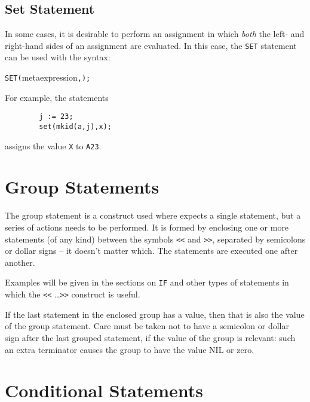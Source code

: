\subsection{Set Statement}
\hypertarget{command:SET}{}

In some cases, it is desirable to perform an assignment in which \emph{both}
the left- and right-hand sides of an assignment are
evaluated.  In this case, the \texttt{SET} statement can be used
with the syntax:
\begin{syntax}
        \texttt{SET(}meta{expression}\texttt{,}\texttt{);}
\end{syntax}
For example, the statements
\begin{verbatim}
        j := 23;
        set(mkid(a,j),x);
\end{verbatim}
assigns the value \texttt{X} to \texttt{A23}.

\section{Group Statements}

The group statement is a construct used where
{\REDUCE} expects a single statement, but a series of actions needs to be
performed.  It is formed by enclosing one or more statements (of any kind)
between the symbols \texttt{<}\texttt{<} and \texttt{>}\texttt{>}, 
separated by semicolons or
dollar signs -- it doesn't matter which.  The statements are executed one
after another.

Examples will be given in the sections on \texttt{IF} and other
types of statements in which the \texttt{<}\texttt{<} \ldots \texttt{>}\texttt{>} 
construct is useful.

If the last statement in the enclosed group has a value, then that is also
the value of the group statement.  Care must be taken not to have a
semicolon or dollar sign after the last grouped statement, if the value of
the group is relevant: such an extra terminator causes the group to have
the value NIL or zero.

\section{Conditional Statements}
\hypertarget{command:IF}{}
\hypertarget{reserved:THEN}{}
\hypertarget{reserved:ELSE}{}

